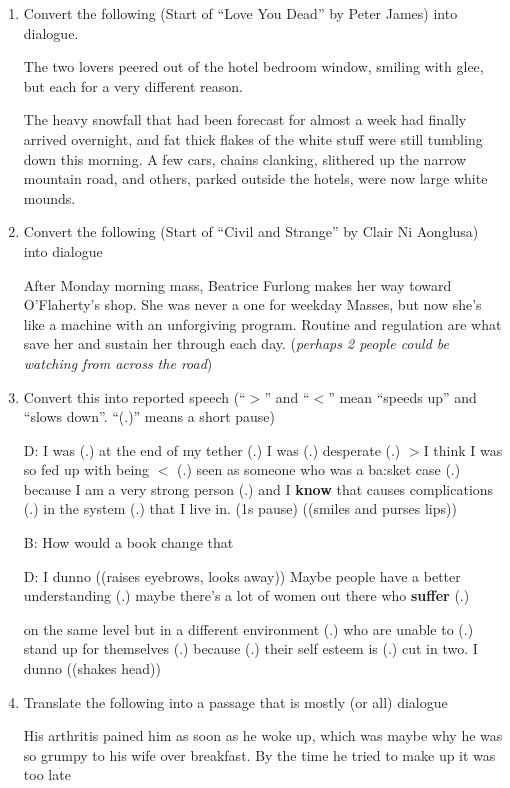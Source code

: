\documentclass[11pt]{article}
\begin{document}
\begin{enumerate}

\item Convert the following  (Start of ``Love You Dead'' by Peter James) into dialogue.

The two lovers peered out of the hotel bedroom window, smiling with glee, but each for a very different reason.

The heavy snowfall that had been forecast for almost a week had finally arrived 
overnight, and fat thick flakes of the white stuff were still tumbling down this
 morning. A few cars, chains clanking, slithered up the narrow mountain road, and others, parked outside the hotels, were now large white mounds.


\item Convert the following  (Start of ``Civil and Strange'' by Clair Ni Aonglusa) into dialogue

After Monday morning mass, Beatrice Furlong makes her way toward O'Flaherty's shop. She was never a one for weekday Masses, but now she's like a machine with an
 unforgiving program. Routine and regulation are what save her and sustain her through each day. (\textit{perhaps 2 people could be watching from across the road})

\item Convert this into reported speech (``$>$'' and  ``$<$'' mean ``speeds up''
 and ``slows down''.  ``(.)'' means a short pause)

D: I was (.) at the end of my tether (.) I was (.) desperate (.) $>$I think 
I was so fed up with being $<$ (.) seen as someone who was a ba:sket case (.) 
because I am a very strong person (.) and I \textbf{know} that causes 
complications (.) in the system (.) that I live in. (1s pause) 
((smiles and purses lips))

B: How would a book change that

D: I dunno ((raises eyebrows, looks away)) Maybe people have a better 
understanding (.) maybe there's a lot of women out there who \textbf{suffer} (.)
 
on the same level but in a different environment (.) who are unable to (.)
 stand  up for themselves (.) because (.) their self esteem is (.) cut in two. 
I dunno ((shakes head))

\item Translate the following into a passage that is mostly (or all) dialogue

His arthritis pained him as soon as he woke up, which was maybe why he was so grumpy to his wife over breakfast. By the time he tried to make up it was too late


\end{enumerate}
\end{document}

